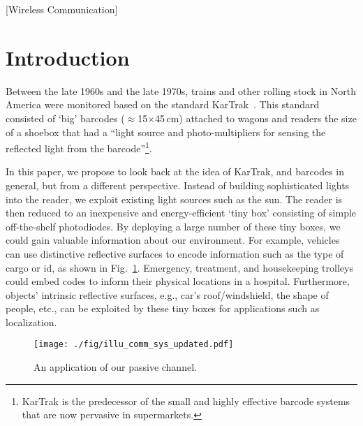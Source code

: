 \documentclass[10pt]{sig-alternate-05-2015}
\begin{document}
[Wireless Communication]


\section{Introduction} \label{sec_intro}
Between the late 1960s and the late 1970s, trains and other rolling stock in North America were monitored based on the standard KarTrak~\cite{nelson1997punched}. This standard consisted of `big' barcodes ($\approx$15$\times$45\,cm) attached to wagons and readers the size of a shoebox that had a ``light source and photo-multipliers for sensing the reflected light from the barcode''\footnote{KarTrak is the predecessor of the small and highly effective barcode systems that are now pervasive in supermarkets.}.

In this paper, we propose to look back at the idea of KarTrak, and barcodes in general, but from a different perspective. Instead of building sophisticated lights into the reader, we exploit existing light sources such as the sun. The reader is then reduced to an inexpensive and energy-efficient `tiny box' consisting of simple off-the-shelf photodiodes.
By deploying a large number of these tiny boxes, we could gain valuable information about our environment. For example, vehicles can use distinctive reflective surfaces to encode information such as the type of cargo or id, as shown in Fig.~\ref{fig_basic_channel}. Emergency, treatment, and housekeeping trolleys could embed codes to inform their physical locations in a hospital. {Furthermore, objects' intrinsic reflective surfaces, e.g., car's roof/windshield, the shape of people, etc., can be exploited by these tiny boxes for applications such as localization.}

\begin{figure}[t!]
	\centering
	\texttt{[image: ./fig/illu\_comm\_sys\_updated.pdf]}
	\vspace{-3mm}
	\caption {An application of our passive channel.}
	\label{fig_basic_channel}
	\vspace{-4mm}
\end{figure}
\end{document}
